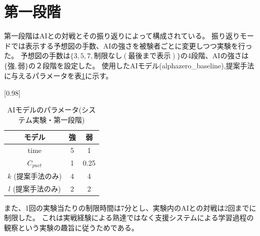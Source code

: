 \section{第一段階}
第一段階はAIとの対戦とその振り返りによって構成されている。
振り返りモードでは表示する予想図の手数、AIの強さを被験者ごとに変更しつつ実験を行った。
予想図の手数は$\{3, 5, 7, 制限なし(最後まで表示)\}$の4段階、AIの強さは$\{強,弱\}$の２段階を設定した。
使用したAIモデル(alphazero\_baseline),提案手法に与えるパラメータを表\ref{table:param-system}に示す。
\begin{table}[H]
	\caption{AIモデルのパラメータ(システム実験・第一段階)}
	\centering
	\scalebox{0.98}[0.98]{
		\begin{tabular}{c|c|c}
			モデル&強&弱\\\hline
			time    & 5 & 1 \\ 
			$C_{puct}$ & 1   & 0.25 \\
			$k$ (提案手法のみ)     & 4 & 4 \\
			$l$ (提案手法のみ)     & 2 & 2 \\

		\end{tabular}
	}
	\label{table:param-system}
\end{table}
また、1回の実験当たりの制限時間は7分とし、実験内のAIとの対戦は2回までに制限した。
これは実戦経験による熟達ではなく支援システムによる学習過程の観察という実験の趣旨に従うためである。
